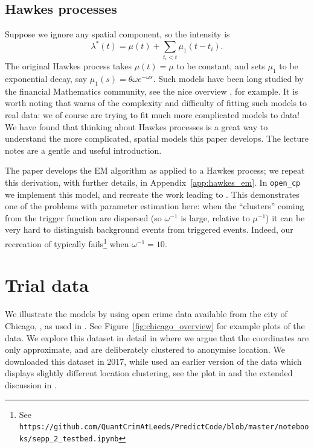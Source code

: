 \documentclass[twoside,a4paper]{article}
\theoremstyle{plain}
\theoremstyle{definition}
\begin{document}
\subsection{Hawkes processes}

Suppose we ignore any spatial component, so the intensity is
\[ \lambda^*(t) = \mu(t) + \sum_{t_i<t} \mu_1(t-t_i). \]
The original Hawkes process takes $\mu(t)=\mu$ to be constant, and sets $\mu_1$ to
be exponential decay, say $\mu_1(s) = \theta \omega e^{-\omega s}$.  Such models have
been long studied by the financial Mathematics community, see the nice overview \cite{ltp},
for example.  It is worth noting that \cite[Section~4]{ltp} warns of the complexity and
difficulty of fitting such models to real data: we of course are trying to fit much more
complicated models to data!  We have found that thinking about Hawkes processes is
a great way to understand the more complicated, spatial models this paper develops.
The lecture notes \cite{ras} are a gentle and useful introduction.

The paper \cite{lm} develops the EM algorithm as applied to a Hawkes process; we
repeat this derivation, with further details, in Appendix~\ref{app:hawkes_em}.
In \texttt{open\_cp} we implement this model, and recreate the work leading to
\cite[Figure~1]{lm}.  This demonstrates one of the problems with parameter estimation here:
when the ``clusters'' coming from the trigger function are dispersed (so $\omega^{-1}$ is
large, relative to $\mu^{-1}$) it can be very hard to distinguish background events from
triggered events.  Indeed, our recreation of \cite[Figure~1]{lm} typically
fails\footnote{See \texttt{https://github.com/QuantCrimAtLeeds/PredictCode/blob/master/notebooks/sepp\_2\_testbed.ipynb}}
when $\omega^{-1}=10$.



\section{Trial data}

We illustrate the models by using open crime data available from the city of Chicago,
\cite{cdata}, as used in \cite{rc}.  See Figure~\ref{fig:chicago_overview} for example
plots of the data.  We explore this dataset in detail in \cite{daws1} where we argue
that the coordinates are only approximate, and are deliberately clustered to anonymise
location.  We downloaded this dataset in 2017, while \cite{rc} used an earlier version of
the data which displays slightly different location clustering, see the plot in \cite{rc}
and the extended discussion in \cite{daws1}.
\end{document}
